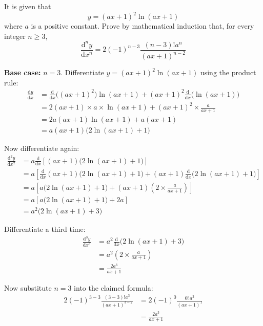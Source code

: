 \documentclass[leqno]{article}
\begin{document}
\begin{enumerate}[
  label=\textbf{\arabic*.},
  leftmargin=*,
  topsep=0pt,
  partopsep=0pt,
  parsep=0pt
]
It is given that \[y = (ax + 1)^2 \ln(ax + 1)\] where $a$ is a positive constant. Prove by mathematical induction that, for every integer $n \ge 3$,
\[
\frac{\mathrm{d}^n y}{\mathrm{d}x^n} = 2(-1)^{n-3} \frac{(n-3)!a^n}{(ax + 1)^{n-2}}
\] 

\vspace*{10pt}

\begin{djsSolution}
\textbf{Base case:} \(n=3\). Differentiate \(y=(ax+1)^2\ln(ax+1)\) using the product rule:
\begin{align*}
\frac{\mathrm{d}y}{\mathrm{d}x}
&=\frac{\mathrm{d}}{\mathrm{d}x}\bigl((ax+1)^2\bigr)\ln(ax+1)+(ax+1)^2\frac{\mathrm{d}}{\mathrm{d}x}\bigl(\ln(ax+1)\bigr)\\
&=2(ax+1)\times a\times \ln(ax+1)+(ax+1)^2\times \frac{a}{ax+1}\\
&=2a(ax+1)\ln(ax+1)+a(ax+1)\\
&=a(ax+1)\bigl(2\ln(ax+1)+1\bigr)
\end{align*}

Now differentiate again:
\begin{align*}
\frac{\mathrm{d}^2y}{\mathrm{d}x^2}
&=a\frac{\mathrm{d}}{\mathrm{d}x}\left[(ax+1)\bigl(2\ln(ax+1)+1\bigr)\right]\\
&=a\left[\frac{\mathrm{d}}{\mathrm{d}x}(ax+1)\bigl(2\ln(ax+1)+1\bigr)+(ax+1)\frac{\mathrm{d}}{\mathrm{d}x}\bigl(2\ln(ax+1)+1\bigr)\right]\\
&=a\left[a\bigl(2\ln(ax+1)+1\bigr)+(ax+1)\left(2\times \frac{a}{ax+1}\right)\right]\\
&=a\left[a\bigl(2\ln(ax+1)+1\bigr)+2a\right]\\
&=a^2\bigl(2\ln(ax+1)+3\bigr)
\end{align*}

Differentiate a third time:
\begin{align*}
\frac{\mathrm{d}^3y}{\mathrm{d}x^3}
&=a^2\frac{\mathrm{d}}{\mathrm{d}x}\bigl(2\ln(ax+1)+3\bigr)\\
&=a^2\left(2\times \frac{a}{ax+1}\right)\\
&=\frac{2a^3}{ax+1}
\end{align*}

Now substitute \(n=3\) into the claimed formula:
\begin{align*}
2(-1)^{3-3}\frac{(3-3)!a^3}{(ax+1)^{3-2}}
&=2(-1)^0\frac{0!\,a^3}{(ax+1)^1}\\
&=\frac{2a^3}{ax+1}
\end{align*}


\end{djsSolution}
\end{enumerate}
\end{document}
